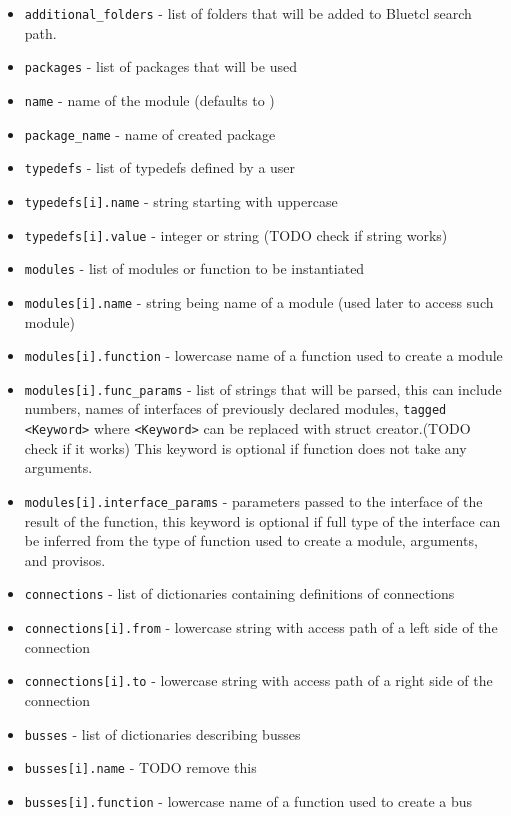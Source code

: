 \documentclass[12pt]{report}
\begin{document}
\begin{itemize}
    \item \verb!additional_folders! - list of folders that will be added to Bluetcl search path.
    \item \verb!packages! - list of packages that will be used
    \item \verb!name! - name of the module (defaults to )
    \item \verb!package_name! - name of created package
    \item \verb!typedefs! - list of typedefs defined by a user
    \item \verb!typedefs[i].name! -  string starting with uppercase
    \item \verb!typedefs[i].value! - integer or string (TODO check if string works)
    \item \verb!modules! - list of modules or function to be instantiated
    \item \verb!modules[i].name! - string being name of a module (used later to access such module)
    \item \verb!modules[i].function! - lowercase name of a function used to create a module
    \item \verb!modules[i].func_params! - list of strings that will be parsed, this can include numbers, names of interfaces of previously declared modules, \verb!tagged <Keyword>! where \verb!<Keyword>! can be replaced with struct creator.(TODO check if it works) This keyword is optional if function does not take any arguments.
    \item \verb!modules[i].interface_params! - parameters passed to the interface of the result of the function, this keyword is optional if full type of the interface can be inferred from the type of function used to create a module, arguments, and provisos.
    \item \verb!connections! - list of dictionaries containing definitions of connections
    \item \verb!connections[i].from! - lowercase string with access path of a left side of the connection
    \item \verb!connections[i].to! - lowercase string with access path of a right side of the connection 
    \item \verb!busses! - list of dictionaries describing busses
    \item \verb!busses[i].name! - TODO remove this
    \item \verb!busses[i].function! - lowercase name of a function used to create a bus

\end{itemize}
\end{document}
